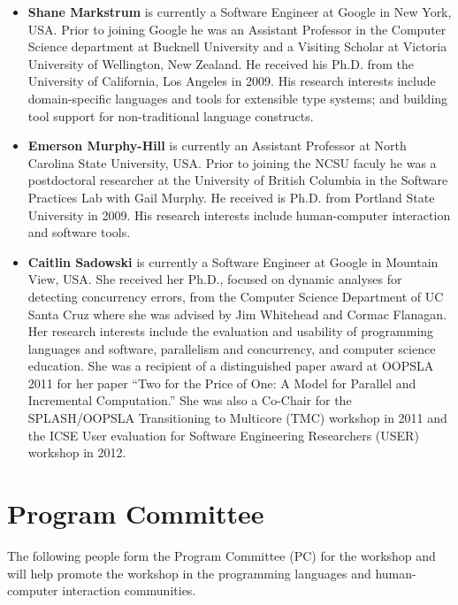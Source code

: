 \documentclass{sigplanconf}
\begin{document}
\begin{itemize}
\item \textbf{Shane Markstrum} is currently a Software Engineer at Google in New York, USA. Prior to joining Google he was an Assistant Professor in the Computer Science
  department at Bucknell University and a Visiting Scholar at Victoria University of Wellington, New Zealand. He received his Ph.D. from the University of
  California, Los Angeles in 2009. His research interests include
  domain-specific languages and tools for extensible type systems; and 
  building tool support for non-traditional language constructs.
  
\item \textbf{Emerson Murphy-Hill} is currently an Assistant Professor at North Carolina State University, USA. Prior to joining the NCSU faculy he was a postdoctoral researcher at the University of British Columbia in the Software Practices Lab with Gail Murphy. 
  He received is Ph.D. from Portland State University in 2009.
  His research interests include human-computer interaction and software tools. 

\item \textbf{Caitlin Sadowski} is currently a Software Engineer at Google in Mountain View, USA. She received her Ph.D., focused on dynamic analyses for detecting concurrency errors, from the Computer Science Department of UC Santa Cruz where she was advised by Jim Whitehead and Cormac Flanagan.  %
 Her research interests include the evaluation and usability of programming languages and software, parallelism and concurrency, and computer science education. She was a recipient of a distinguished paper award at OOPSLA 2011 for her paper ``Two for the Price of One: A Model for Parallel and Incremental Computation.''
 She was also a Co-Chair for the SPLASH/OOPSLA Transitioning to Multicore (TMC) workshop in 2011 and the ICSE User evaluation for Software Engineering Researchers (USER) workshop in 2012. 
\end{itemize}

\section{Program Committee}

The following people form the Program Committee (PC) for the workshop and will help promote the workshop in the programming languages and human-computer interaction communities.
\end{document}
